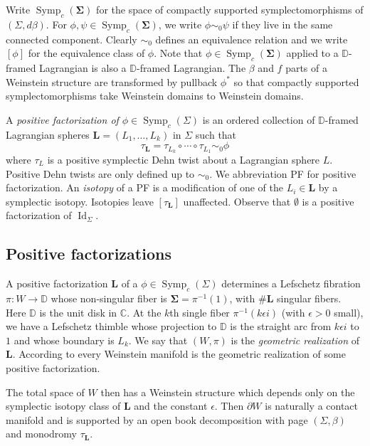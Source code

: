 \documentclass[11pt]{amsart}
\DeclareMathOperator{\Symp}{Symp}
\DeclareMathOperator{\Id}{Id}
\newcommand{\thicc}[1]{\pmb{#1}}
\newcommand{\C}{\mathbb{C}}
\newcommand{\disk}{\mathbb{D}}
\newcommand{\LagTuple}{\thicc{L}}
\begin{document}
Write $\Symp_{c}(\thicc{\Sigma})$ for the space of compactly supported symplectomorphisms of $(\Sigma, d\beta)$. For $\phi, \psi \in \Symp_{c}(\thicc{\Sigma})$, we write $\phi \sim_{0} \psi$ if they live in the same connected component. Clearly $\sim_{0}$ defines an equivalence relation and we write $[\phi]$ for the equivalence class of $\phi$. Note that $\phi \in \Symp_{c}(\thicc{\Sigma})$ applied to a $\disk$-framed Lagrangian is also a $\disk$-framed Lagrangian. The $\beta$ and $f$ parts of a Weinstein structure are transformed by pullback $\phi^{\ast}$ so that compactly supported symplectomorphisms take Weinstein domains to Weinstein domains.

A \emph{positive factorization of $\phi \in \Symp_{c}(\Sigma)$} is an ordered collection of $\disk$-framed Lagrangian spheres $\LagTuple = (L_{1}, \dots, L_{k})$ in $\Sigma$ such that
\begin{equation*}
\tau_{\LagTuple} = \tau_{L_{k}} \circ \cdots \circ \tau_{L_{1}} \sim_{0} \phi
\end{equation*}
where $\tau_{L}$ is a positive symplectic Dehn twist about a Lagrangian sphere $L$. Positive Dehn twists are only defined up to $\sim_{0}$. We abbreviation PF for positive factorization. An \emph{isotopy} of a PF is a modification of one of the $L_{i} \in \LagTuple$ by a symplectic isotopy. Isotopies leave $[\tau_{\LagTuple}]$ unaffected. Observe that $\emptyset$ is a positive factorization of $\Id_{\Sigma}$.

\subsection{Positive factorizations}

A positive factorization $\LagTuple$ of a $\phi \in \Symp_{c}(\Sigma)$ determines a Lefschetz fibration $\pi: W \rightarrow \disk$ whose non-singular fiber is $\thicc{\Sigma} = \pi^{-1}(1)$, with $\# \LagTuple$ singular fibers. Here $\disk$ is the unit disk in $\C$. At the $k$th single fiber $\pi^{-1}(k\epsilon i)$ (with $\epsilon > 0$ small), we have a Lefschetz thimble whose projection to $\disk$ is the straight arc from $k\epsilon i$ to $1$ and whose boundary is $L_{k}$. We say that $(W, \pi)$ is the \emph{geometric realization} of $\LagTuple$. According to \cite{BHH:GirouxCorrespondence, GirouxPardon} every Weinstein manifold is the geometric realization of some positive factorization.

The total space of $W$ then has a Weinstein structure which depends only on the symplectic isotopy class of $\LagTuple$ and the constant $\epsilon$. Then $\partial W$ is naturally a contact manifold and is supported by an open book decomposition with page $(\Sigma, \beta)$ and monodromy $\tau_{\LagTuple}$.
\end{document}
